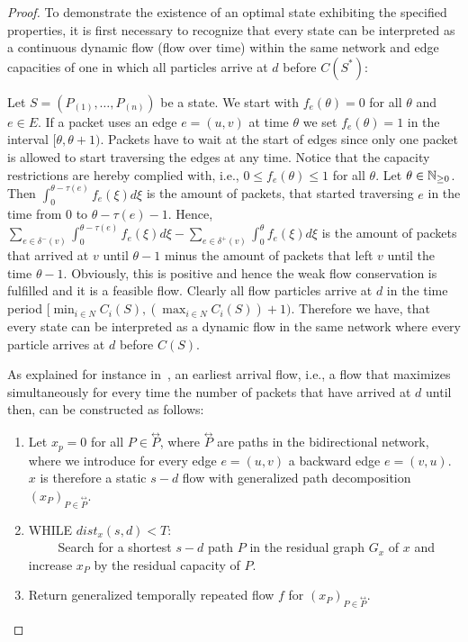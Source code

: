 \begin{proof}
    To demonstrate the existence of an optimal state exhibiting the specified properties, it is first necessary to recognize that every state can be interpreted as a continuous dynamic flow (flow over time) within the same network and edge capacities of one in which all particles arrive at $d$ before $C(S^*)$:
    
    Let $S=(P_{(1)}, \ldots, P_{(n)})$ be a state. We start with $f_e(\theta)=0$ for all $\theta$ and $e\in E$. If a packet uses an edge $e=(u,v)$ at time $\theta$ we set $f_e(\theta)=1$ in the interval $[\theta,\theta +1)$. Packets have to wait at the start of edges since only one packet is allowed to start traversing the edges at any time.
    Notice that the capacity restrictions are hereby complied with, i.e., $0\leq f_e(\theta)\leq 1$ for all $\theta$.
    Let $\theta \in \mathbb{N}_{\geq 0}$. Then $\int_{0}^{\theta-\tau(e)} f_e(\xi) d\xi$ is the amount of packets, that started traversing $e$ in the time from 0 to $\theta-\tau(e) -1$. Hence, $\sum_{e\in \delta^-(v)} \int_0^{\theta -\tau(e)} f_e(\xi) d\xi - \sum_{e\in \delta^+(v)} \int_0^{\theta} f_e(\xi) d\xi$ is the amount of packets that arrived at $v$ until $\theta -1$ minus the amount of packets that left $v$ until the time $\theta -1$. Obviously, this is positive and hence the weak flow conservation is fulfilled and it is a feasible flow. Clearly all flow particles arrive at $d$ in the time period $[\min_{i\in N} C_i(S), (\max_{i\in N} C_i(S)) +1)$. Therefore we have, that every state can be interpreted as a dynamic flow in the same network where every particle arrives at $d$ before $C(S)$.

    As explained for instance in~\cite{DBLP:conf/bonnco/Skutella08}, an earliest arrival flow, i.e., a flow that maximizes simultaneously for every time the number of packets that have arrived at $d$ until then, can be constructed as follows:
    \begin{enumerate}
        \item Let $x_p=0$ for all $P\in \overset{\leftrightarrow}{P}$, where $\overset{\leftrightarrow}{P}$ are paths in the bidirectional network, where we introduce for every edge $e=(u,v)$ a backward edge $e=(v,u)$. $x$ is therefore a static $s-d$ flow with generalized path decomposition $(x_P)_{P\in \overset{\leftrightarrow}{P}}$.
        \item WHILE $dist_x(s,d)<T$:\\
        $\qquad$ Search for a shortest $s-d$ path $P$ in the residual graph $G_x$ of $x$ and increase $x_P$ by the residual capacity of $P$.
        \item Return generalized temporally repeated flow $f$ for $(x_P)_{P\in \overset{\leftrightarrow}{P}}.$
    \end{enumerate}
    

\end{proof}
